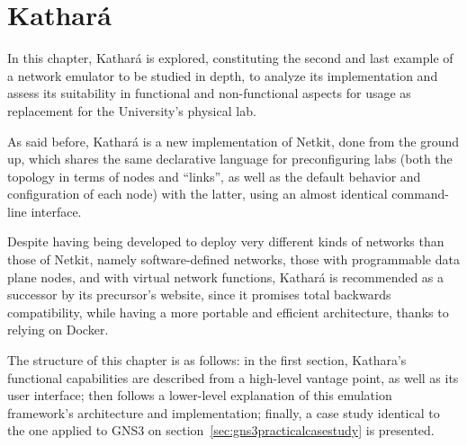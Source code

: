 
\chapter{Kathará}
\label{ch:kathara}

In this chapter, Kathará is explored, constituting the second and last example of a network emulator to be studied in depth, to analyze its implementation and assess its suitability in functional and non-functional aspects for usage as replacement for the University's physical lab.

As said before, Kathará is a new implementation of Netkit, done from the ground up, which shares the same declarative language for preconfiguring labs (both the topology in terms of nodes and ``links'', as well as the default behavior and configuration of each node) with the latter, using an almost identical command-line interface.

Despite having being developed to deploy very different kinds of networks than those of Netkit, namely software-defined networks, those with programmable data plane nodes, and with virtual network functions, Kathará is recommended as a successor by its precursor's website, since it promises total backwards compatibility, while having a more portable and efficient architecture, thanks to relying on Docker.

The structure of this chapter is as follows: in the first section, Kathara's functional capabilities are described from a high-level vantage point, as well as its user interface; then follows a lower-level explanation of this emulation framework's architecture and implementation; finally, a case study identical to the one applied to GNS3 on section~\ref{sec:gns3practicalcasestudy} is presented.







